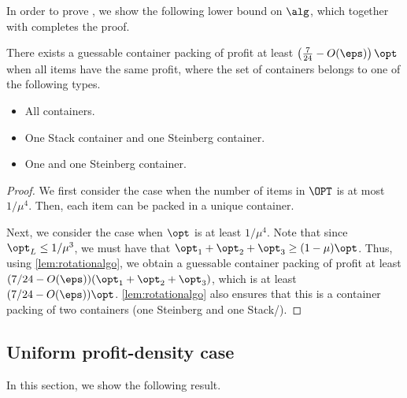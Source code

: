 In order to prove , we show the following lower bound on $\alg$, which together with  completes the proof.

\begin{lemma}
    There exists a guessable container packing of profit at least $\left(\frac{7}{24}-O(\eps)\right)\opt$ when all items have the same profit, where the set of containers belongs to one of the following types.
    \begin{itemize}
        \item All  containers.
        \item One Stack container and one Steinberg container.
        \item One \LContainer{} and one Steinberg container.
    \end{itemize}
\end{lemma}
\begin{proof}
    We first consider the case when the number of items in $\OPT$ is at most $1/\mu^4$.
    Then, each item can be packed in a unique  container.

    Next, we consider the case when $\opt$ is at least $1/\mu^4$. Note that since $\opt_L\le 1/\mu^3$, we must have that $\opt_1+\opt_2+\opt_3\ge (1-\mu)\opt$.
    Thus, using \cref{lem:rotationalgo}, we obtain a guessable container packing of profit at least $(7/24-O(\eps))(\opt_1+\opt_2+\opt_3)$, which is at least $(7/24-O(\eps))\opt$.
    \cref{lem:rotationalgo} also ensures that this is a container packing of two containers (one Steinberg and one Stack/\LContainer{}).
\end{proof}
\subsection{Uniform profit-density case}
\label{sec:tdkrp}
In this section, we show the following result.

